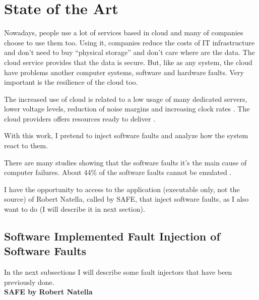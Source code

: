 \section{State of the Art}

Nowadays, people use a lot of services based in cloud and many of companies choose to use them too. Using it, companies reduce the costs of IT infrastructure and don't need to buy ``physical storage'' and don't care where are the data. The cloud service provides that the data is secure.
But, like as any system, the cloud have problems  another computer systems, software and hardware faults. Very important is the resilience of the cloud too.

The increased use of cloud is related to a low usage of many dedicated servers, lower voltage levels, reduction of noise margins and increasing clock rates \cite{wolter2012resilience}. The cloud providers offers resources ready to deliver \cite{wolter2012resilience}.

With this work, I pretend to inject software faults and analyze how the system react to them.

There are many studies showing that the software faults\cite{avizzienisbasic} it's the main cause of computer failures.
About 44\% of the software faults cannot be emulated \cite{madeira2000emulation}.




I have the opportunity to access to the application (executable only, not the source) of Robert Natella, called by SAFE, that inject software faults, as I also want to do (I will describe it in next section).

\subsection{Software Implemented Fault Injection of Software Faults}
In the next subsections I will describe some fault injectors that have been previously done.\\

\textbf{SAFE by Robert Natella}\\

